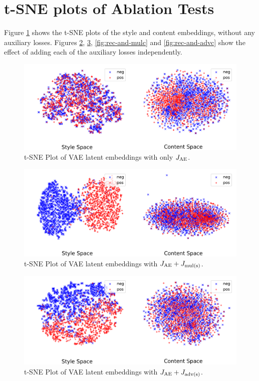 \documentclass[letterpaper]{article}
\begin{document}
\section{t-SNE plots of Ablation Tests}

Figure \ref{fig:only-rec} shows the t-SNE plots of the style and content embeddings, without any auxiliary losses.
Figures \ref{fig:rec-and-muls}, \ref{fig:rec-and-advs}, \ref{fig:rec-and-mulc} and \ref{fig:rec-and-advc} show the effect of adding each of the auxiliary losses independently.

\begin{figure}[ht]
	\includegraphics[width=\linewidth]{vae-latent-spaces-only-rec}
	\caption{t-SNE Plot of VAE latent embeddings with only $J_{\text{AE}}$.}
	\label{fig:only-rec}
\end{figure}

\begin{figure}[ht]
	\includegraphics[width=\linewidth]{vae-latent-spaces-rec-muls}
	\caption{t-SNE Plot of VAE latent embeddings with $J_{\text{AE}} + J_{\text{mul(s)}}$.}
	\label{fig:rec-and-muls}
\end{figure}

\begin{figure}[ht]
	\includegraphics[width=\linewidth]{vae-latent-spaces-rec-advs}
	\caption{t-SNE Plot of VAE latent embeddings with $J_{\text{AE}} + J_{\text{adv(s)}}$.}
	\label{fig:rec-and-advs}
\end{figure}
\end{document}

